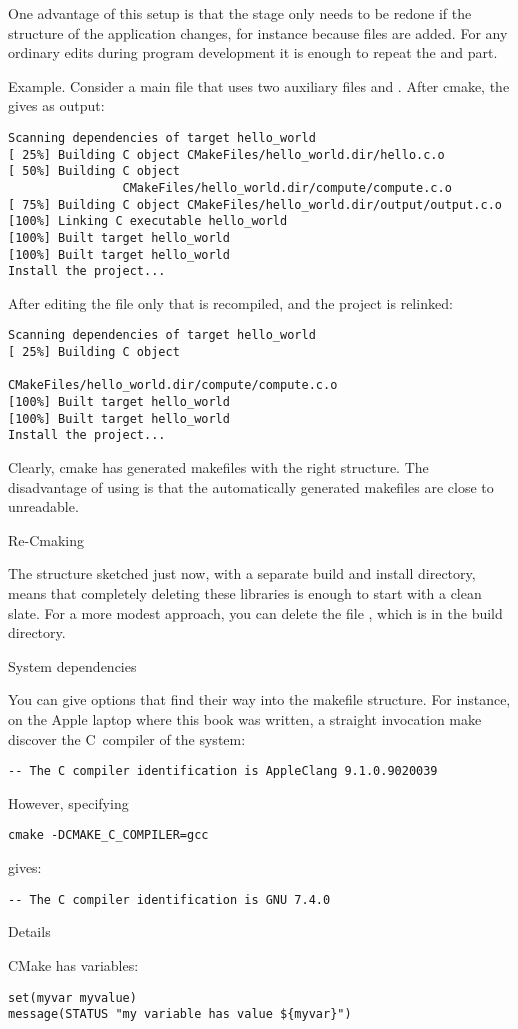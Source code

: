 One advantage of this setup is that the  stage only needs to
be redone if the structure of the application changes, for instance
because files are added. For any ordinary edits during program
development it is enough to repeat the  and 
part.

Example. Consider a main file  that uses two auxiliary
files  and . After cmake, the  gives as output:
\begin{verbatim}
Scanning dependencies of target hello_world
[ 25%] Building C object CMakeFiles/hello_world.dir/hello.c.o
[ 50%] Building C object
                CMakeFiles/hello_world.dir/compute/compute.c.o
[ 75%] Building C object CMakeFiles/hello_world.dir/output/output.c.o
[100%] Linking C executable hello_world
[100%] Built target hello_world
[100%] Built target hello_world
Install the project...
\end{verbatim}
After editing the  file only that is recompiled, and the
project is relinked:
\begin{verbatim}
Scanning dependencies of target hello_world
[ 25%] Building C object
                
CMakeFiles/hello_world.dir/compute/compute.c.o
[100%] Built target hello_world
[100%] Built target hello_world
Install the project...
\end{verbatim}
Clearly, cmake has generated makefiles with the right structure.
The disadvantage of using  is that the automatically
generated makefiles are close to unreadable.

 {Re-Cmaking}

The structure sketched just now, with a separate build and install
directory, means that completely deleting these libraries is enough to
start with a clean slate. For a more modest approach, you can delete
the file , which is in the build directory.

 {System dependencies}

You can give  options that find their way into the makefile
structure. For instance, on the Apple laptop where this book was
written, a straight invocation make  discover the C~compiler of the system:
\begin{verbatim}
-- The C compiler identification is AppleClang 9.1.0.9020039
\end{verbatim}
However, specifying
\begin{verbatim}
cmake -DCMAKE_C_COMPILER=gcc
\end{verbatim}
gives:
\begin{verbatim}
-- The C compiler identification is GNU 7.4.0
\end{verbatim}

 {Details}

CMake has variables:
\begin{verbatim}
set(myvar myvalue)
message(STATUS "my variable has value ${myvar}")
\end{verbatim}


